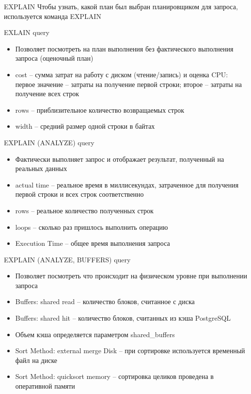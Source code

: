 \documentclass[12pt]{article}
\begin{document}
\begin{defin}{EXPLAIN}
    Чтобы узнать, какой план был выбран планировщиком для запроса, используется команда EXPLAIN 

    EXLAIN query 

    \begin{itemize}
        \item Позволяет посмотреть на план выполнения без фактического выполнения запроса (оценочный план)
        \item cost -- сумма затрат на работу с диском (чтение/запись) и оценка CPU: первое значение -- затраты на получение первой строки; второе -- затраты на получение всех строк
        \item rows -- приблизительное количество возвращаемых строк 
        \item width -- средний размер одной строки в байтах 
    \end{itemize}

    EXPLAIN (ANALYZE) query 

    \begin{itemize}
        \item Фактически выполняет запрос и отображает результат, полученный на реальных данных 
        \item actual time -- реальное время в миллисекундах, затраченное для получения первой строки и всех строк соответственно 
        \item rows -- реальное количество полученных строк 
        \item loops -- сколько раз пришлось выполнить операцию 
        \item Execution Time -- общее время выполнения запроса 
    \end{itemize}

    EXPLAIN (ANALYZE, BUFFERS) query 

    \begin{itemize}
        \item Позволяет посмотреть что происходит на физическом уровне при выполнении запроса 
        \item Buffers: shared read -- количество блоков, считанное с диска 
        \item Buffers: shared hit -- количество блоков, считанных из кэша PostgreSQL
        \item Объем кэша определяется параметром shared\_buffers
        \item Sort Method: external merge Disk -- при сортировке используется временный файл на диске 
        \item Sort Method: quicksort memory -- сортировка целиков проведена в оперативной памяти 
    \end{itemize}


\end{defin}
\end{document}

